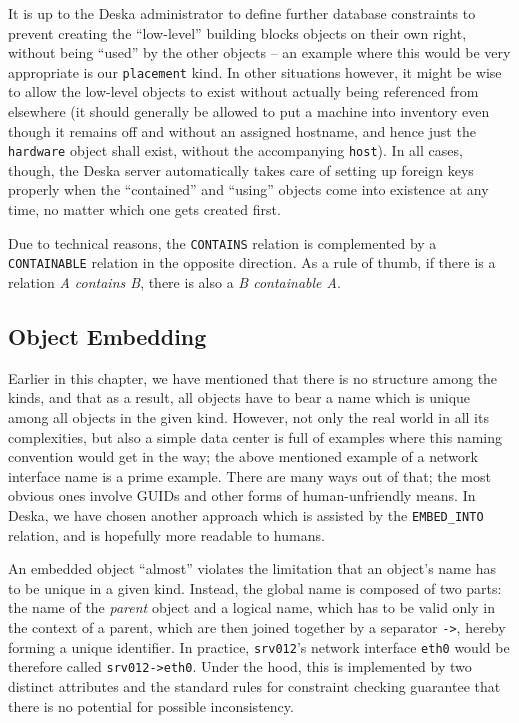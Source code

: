 \documentclass[deska]{subfiles}
\begin{document}
It is up to the Deska administrator to define further database constraints to prevent creating the ``low-level''
building blocks objects on their own right, without being ``used'' by the other objects -- an example where this would
be very appropriate is our {\tt placement} kind.  In other situations however, it might be wise to allow the low-level
objects to exist without actually being referenced from elsewhere (it should generally be allowed to put a machine into
inventory even though it remains off and without an assigned hostname, and hence just the {\tt hardware} object shall
exist, without the accompanying {\tt host}).  In all cases, though, the Deska server automatically takes care of setting
up foreign keys properly when the ``contained'' and ``using'' objects come into existence at any time, no matter which
one gets created first.

Due to technical reasons, the {\tt CONTAINS} relation is complemented by a {\tt CONTAINABLE} relation in the opposite
direction.  As a rule of thumb, if there is a relation {\em A contains B}, there is also a {\em B containable A}.

\subsection{Object Embedding}

Earlier in this chapter, we have mentioned that there is no structure among the kinds, and that as a result, all objects
have to bear a name which is unique among all objects in the given kind.  However, not only the real world in all its
complexities, but also a simple data center is full of examples where this naming convention would get in the way; the
above mentioned example of a network interface name is a prime example.  There are many ways out of that; the most
obvious ones involve GUIDs and other forms of human-unfriendly means.  In Deska, we have chosen another approach which
is assisted by the {\tt EMBED\_INTO} relation, and is hopefully more readable to humans.

An embedded object ``almost'' violates the limitation that an object's name has to be unique in a given kind.  Instead,
the global name is composed of two parts: the name of the {\em parent} object and a logical name, which has to be valid
only in the context of a parent, which are then joined together by a separator {\tt ->}, hereby forming a unique
identifier.  In practice, {\tt srv012}'s network interface {\tt eth0} would be therefore called {\tt srv012->eth0}.
Under the hood, this is implemented by two distinct attributes and the standard rules for constraint checking guarantee
that there is no potential for possible inconsistency.
\end{document}
